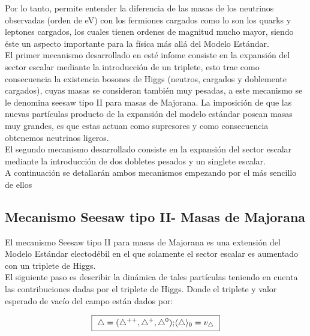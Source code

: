 \documentclass[12pt]{article}
\begin{document}
Por lo tanto, permite entender la diferencia de las masas de los neutrinos observadas (orden de eV) con los fermiones cargados como lo son los quarks y leptones cargados, los cuales tienen ordenes de magnitud mucho mayor, siendo éste un aspecto importante para la física más allá del Modelo Estándar.   \\ 

El primer mecanismo desarrollado en esté infome consiste  en la expansión del sector escalar mediante la introducción de un triplete, esto trae como consecuencia la existencia bosones de Higgs (neutros, cargados y doblemente cargados), cuyas masas se consideran también muy pesadas, a este mecanismo se le denomina seesaw tipo II para masas de Majorana. La imposición de que las nuevas partículas producto de la expansión del modelo estándar posean masas muy grandes, es que estas actuan como supresores y como consecuencia obtenemos neutrinos ligeros.\\ 

El segundo mecanismo desarrollado consiste en la expansión del sector escalar mediante la introducción de dos dobletes pesados y un singlete escalar. \\

A continuación se detallarán ambos mecanismos empezando por el más sencillo de ellos


\subsection{Mecanismo Seesaw tipo II- Masas de Majorana}

El mecanismo Seesaw tipo II para masas de Majorana es una extensión del Modelo Estándar electodébil en el que solamente el sector escalar es aumentado con un triplete de Higgs.\\

El siguiente paso es describir la dinámica de tales partículas teniendo en cuenta las contribuciones dadas por el triplete de Higgs. Donde el  triplete y valor esperado de vacío del campo están dados por: 


\begin{equation}
\fbox{ $\begin{aligned}
     \triangle= (\triangle^{++},  \triangle^{+},    \triangle^{0}) ; &  \langle  \triangle \rangle_0 = v_\triangle \\
\end{aligned} $  }
\label{eq:11}
\end{equation} 
\end{document}
